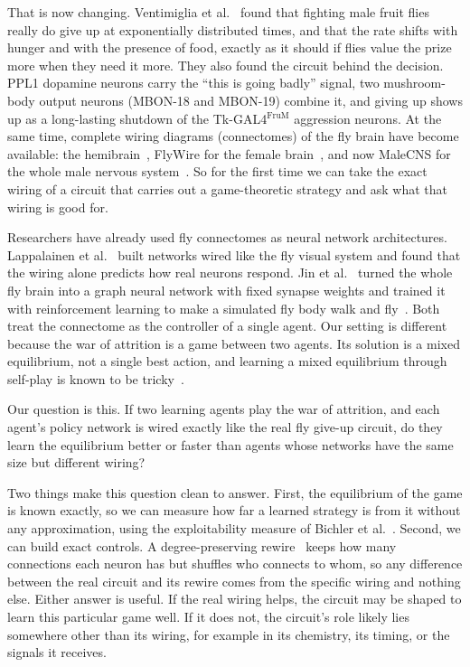 \documentclass{article}
\begin{document}
That is now changing. Ventimiglia et al.~\cite{ventimiglia2026} found that fighting male fruit flies really do give up at exponentially distributed times, and that the rate shifts with hunger and with the presence of food, exactly as it should if flies value the prize more when they need it more. They also found the circuit behind the decision. PPL1 dopamine neurons carry the ``this is going badly'' signal, two mushroom-body output neurons (MBON-18 and MBON-19) combine it, and giving up shows up as a long-lasting shutdown of the Tk-GAL4$^{\mathrm{FruM}}$ aggression neurons. At the same time, complete wiring diagrams (connectomes) of the fly brain have become available: the hemibrain~\cite{scheffer2020}, FlyWire for the female brain~\cite{dorkenwald2024}, and now MaleCNS for the whole male nervous system~\cite{berg2026}. So for the first time we can take the exact wiring of a circuit that carries out a game-theoretic strategy and ask what that wiring is good for.

Researchers have already used fly connectomes as neural network architectures. Lappalainen et al.~\cite{lappalainen2024} built networks wired like the fly visual system and found that the wiring alone predicts how real neurons respond. Jin et al.~\cite{jin2026} turned the whole fly brain into a graph neural network with fixed synapse weights and trained it with reinforcement learning to make a simulated fly body walk and fly~\cite{vaxenburg2025}. Both treat the connectome as the controller of a single agent. Our setting is different because the war of attrition is a game between two agents. Its solution is a mixed equilibrium, not a single best action, and learning a mixed equilibrium through self-play is known to be tricky~\cite{fudenberg1998, hofbauer2009}.

Our question is this. If two learning agents play the war of attrition, and each agent's policy network is wired exactly like the real fly give-up circuit, do they learn the equilibrium better or faster than agents whose networks have the same size but different wiring?

Two things make this question clean to answer. First, the equilibrium of the game is known exactly, so we can measure how far a learned strategy is from it without any approximation, using the exploitability measure of Bichler et al.~\cite{bichler2021}. Second, we can build exact controls. A degree-preserving rewire~\cite{maslov2002} keeps how many connections each neuron has but shuffles who connects to whom, so any difference between the real circuit and its rewire comes from the specific wiring and nothing else. Either answer is useful. If the real wiring helps, the circuit may be shaped to learn this particular game well. If it does not, the circuit's role likely lies somewhere other than its wiring, for example in its chemistry, its timing, or the signals it receives.
\end{document}
